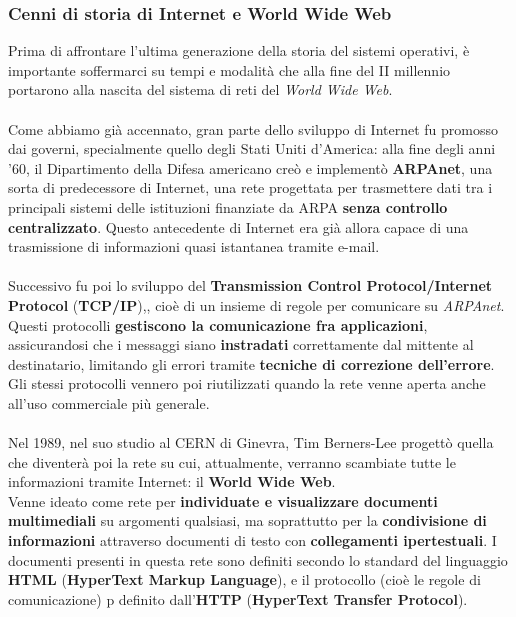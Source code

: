 \documentclass[12pt, letterpaper]{article}
\begin{document}
\subsubsection{Cenni di storia di Internet e World Wide Web}
Prima di affrontare l'ultima generazione della storia del sistemi operativi, è importante soffermarci su tempi e modalità che alla fine del II millennio portarono alla nascita del sistema di reti del \textit{World Wide Web}. \\ \\
Come abbiamo già accennato, gran parte dello sviluppo di Internet fu promosso dai governi, specialmente quello degli Stati Uniti d'America: alla fine degli anni '60, il Dipartimento della Difesa americano creò e implementò \textbf{ARPAnet}, una sorta di predecessore di Internet, una rete progettata per trasmettere dati tra i principali sistemi delle istituzioni finanziate da ARPA \textbf{senza controllo centralizzato}. Questo antecedente di Internet era già allora capace di una trasmissione di informazioni quasi istantanea tramite e-mail. \\ \\
Successivo fu poi lo sviluppo del \textbf{Transmission Control Protocol/Internet Protocol} (\textbf{TCP/IP}),, cioè di un insieme di regole per comunicare su \textit{ARPAnet}. Questi protocolli \textbf{gestiscono la comunicazione fra applicazioni}, assicurandosi che i messaggi siano \textbf{instradati} correttamente dal mittente al destinatario, limitando gli errori tramite \textbf{tecniche di correzione dell'errore}. Gli stessi protocolli vennero poi riutilizzati quando la rete venne aperta anche all'uso commerciale più generale. \\ \\
Nel 1989, nel suo studio al CERN di Ginevra, Tim Berners-Lee progettò quella che diventerà poi la rete su cui, attualmente, verranno scambiate tutte le informazioni tramite Internet: il \textbf{World Wide Web}. \\
Venne ideato come rete per \textbf{individuate e visualizzare documenti multimediali} su argomenti qualsiasi, ma soprattutto per la \textbf{condivisione di informazioni} attraverso documenti di testo con \textbf{collegamenti ipertestuali}. I documenti presenti in questa rete sono definiti secondo lo standard del linguaggio \textbf{HTML} (\textbf{HyperText Markup Language}), e il protocollo (cioè le regole di comunicazione) p definito dall'\textbf{HTTP} (\textbf{HyperText Transfer Protocol}).
\end{document}
